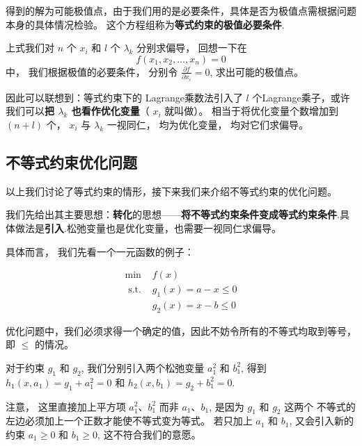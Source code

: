得到的解为可能极值点，由于我们用的是必要条件，具体是否为极值点需根据问题本身的具体情况检验。 这个方程组称为\textbf{等式约束的极值必要条件}.

上式我们对 $ n $ 个 $ x_{i} $ 和 $ l $ 个 $ \lambda_{k} $ 分别求偏导， 回想一下在 
\begin{equation} f\left(x_{1}, x_{2}, \ldots, x_{n}\right)=0 \end{equation} 
中， 我们根据极值的必要条件， 分别令 $ \frac{\partial f}{\partial x_{i}}=0 $, 求出可能的极值点。 

因此可以联想到：等式约束下的 Lagrange乘数法引入了 $ l $ 个Lagrange乘子，或许我们可以\textbf{把 $ \lambda_{k} $ 也看作优化变量}（ $ x_{i} $ 就叫做）。 相当于将优化变量个数增加到 $ (n+l) $ 个， $ x_{i} $ 与 $ \lambda_{k} $ 一视同仁， 均为优化变量， 均对它们求偏导。

\subsection{不等式约束优化问题}

以上我们讨论了等式约束的情形，接下来我们来介绍不等式约束的优化问题。

我们先给出其主要思想：\textbf{转化}的思想——\textbf{将不等式约束条件变成等式约束条件}.具体做法是\textbf{引入}.松弛变量也是优化变量，也需要一视同仁求偏导。

具体而言， 我们先看一个一元函数的例子：

\begin{example}
    \begin{equation}\begin{aligned}
        \min& f(x)\\
    \text { s.t. }& g_{1}(x)=a-x \leq 0\\
    &g_{2}(x)=x-b \leq 0
    \end{aligned} \end{equation}
\end{example}

\begin{remark}
    优化问题中，我们必须求得一个确定的值，因此不妨令所有的不等式均取到等号，即 $ \leq $ 的情况。
\end{remark}


对于约束 $ g_{1} $ 和 $ g_{2} $, 我们分别引入两个松弛变量 $ a_{1}^{2} $ 和 $ b_{1}^{2} $, 得到 $ h_{1}\left(x, a_{1}\right)=g_{1}+a_{1}^{2}=0 $ 和 $ h_{2}\left(x, b_{1}\right)=g_{2}+b_{1}^{2}=0 $. 

\begin{remark}
    注意， 这里直接加上平方项 $ a_{1}^{2} 、 b_{1}^{2} $ 而非 $ a_{1} 、 b_{1} $, 是因为 $ g_{1} $ 和 $ g_{2} $ 这两个 不等式的左边必须加上一个正数才能使不等式变为等式。 若只加上 $ a_{1} $ 和 $ b_{1} $, 又会引入新的约束 $ a_{1} \geq 0 $ 和 $ b_{1} \geq 0 $, 这不符合我们的意愿。
\end{remark}



